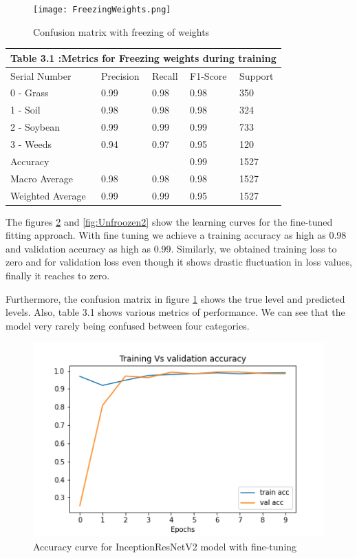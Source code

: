 \documentclass{report}
\begin{document}
\begin{figure}[H]
\centering
\texttt{[image: FreezingWeights.png]}
\caption{Confusion matrix with freezing of weights}
\label{fig:CM2}
\end{figure}
\begin{tabular}[H]{ | p{3cm}||p{2cm}||p{2cm}||p{2cm}||p{2cm}|}
\hline
 \multicolumn{5}{|c|}{ Table 3.1 :Metrics for Freezing weights during training}\\
 \hline
 Serial Number & Precision & Recall & F1-Score & Support\\
 \hline
 0 - Grass & 0.99 & 0.98 & 0.98 & 350 \\
 1 - Soil & 0.98 & 0.98 & 0.98 & 324\\
 2 - Soybean & 0.99 & 0.99 & 0.99 & 733\\
 3 - Weeds & 0.94 & 0.97 & 0.95 & 120 \\
 Accuracy &  &  & 0.99 & 1527\\
 Macro Average & 0.98 & 0.98 & 0.98 & 1527\\
 Weighted Average & 0.99 & 0.99 & 0.95 & 1527\\
 \hline
\end{tabular}


\vspace{1cm}
The figures \ref{fig:Unfroozen1} and \ref{fig:Unfroozen2} show the learning curves for the fine-tuned fitting approach. With fine tuning we achieve a training accuracy as high as 0.98 and validation accuracy as high as 0.99. Similarly, we obtained training loss to zero and for validation loss even though it shows drastic fluctuation in loss values, finally it reaches to zero. 






Furthermore, the confusion matrix in figure \ref{fig:CM2} shows the true level and predicted levels. Also, table 3.1 shows various metrics of performance.  We can see that the model very rarely being confused between four categories. 




\hfill


\begin{figure}[H]
\centering
\includegraphics[width=\textwidth]{AccVal_FineTuneInceptionResNetV2.png}
\caption{Accuracy curve for InceptionResNetV2 model with fine-tuning}
\label{fig:Unfroozen1}
\end{figure}
\end{document}
